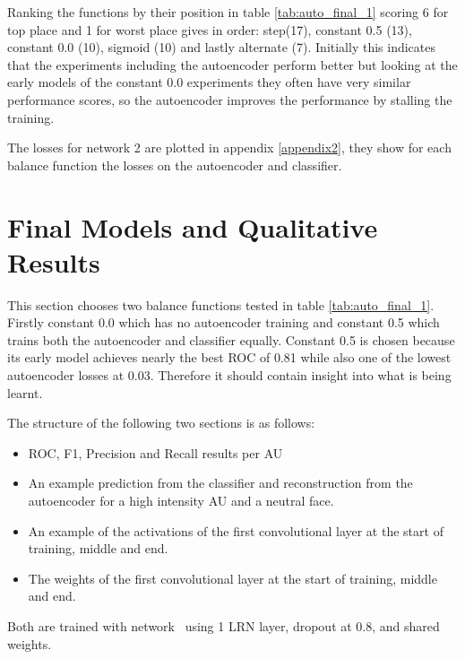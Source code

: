           Ranking the functions by their position in table \ref{tab:auto_final_1} scoring 6 for top place and 1 for worst place gives in order:
          step(17), constant 0.5 (13), constant 0.0 (10), sigmoid (10) and lastly alternate (7). Initially this indicates that the
          experiments including the autoencoder perform better but looking at the early models of the constant 0.0 experiments
          they often have very similar performance scores, so the autoencoder improves the performance by stalling the training.

          The losses for network 2 are plotted in appendix \ref{appendix2}, they show for each
          balance function the losses on the autoencoder and classifier.

    \section{Final Models and Qualitative Results}

      This section chooses two balance functions tested in table \ref{tab:auto_final_1}.
      Firstly constant 0.0 which has no autoencoder training and constant 0.5 which trains
      both the autoencoder and classifier equally. Constant 0.5 is chosen because its early
      model achieves nearly the best ROC of 0.81 while also one of the lowest autoencoder losses
      at 0.03. Therefore it should contain insight into what is being learnt.

      The structure of the following two sections is as follows:
      \begin{itemize}
        \item ROC, F1, Precision and Recall results per AU
        \item An example prediction from the classifier and reconstruction from the autoencoder for a high intensity AU and a neutral face.
        \item An example of the activations of the first convolutional layer at the start of training, middle and end.
        \item The weights of the first convolutional layer at the start of training, middle and end.
      \end{itemize}

      Both are trained with network \networkII\ using 1 LRN layer, dropout at 0.8,
      and shared weights.

